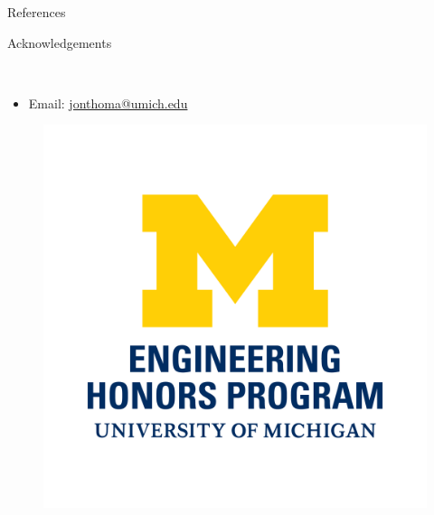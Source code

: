 \documentclass[final]{beamer}
\newlength{\halfcolwid}
\newlength{\onecolwid}
\begin{document}
\begin{frame}[t]
\begin{columns}[t]
\begin{column}{\onecolwid}
\begin{block}{References}
\vspace{-0.5cm}
\nocite{*} %
\small{
}

\end{block}




\begin{alertblock}{Acknowledgements}

\small{} \\

\begin{itemize}
\item Email: \href{mailto:jonthoma@umich.edu}{jonthoma@umich.edu}
\end{itemize}
\end{alertblock}

\vspace{-2cm}
\begin{center}
\begin{figure}
\includegraphics[width=0.4\linewidth]{CoE-Honors-vert.png}
\end{figure}
\end{center}



\end{column}
\end{columns}
\end{frame}
\end{document}
